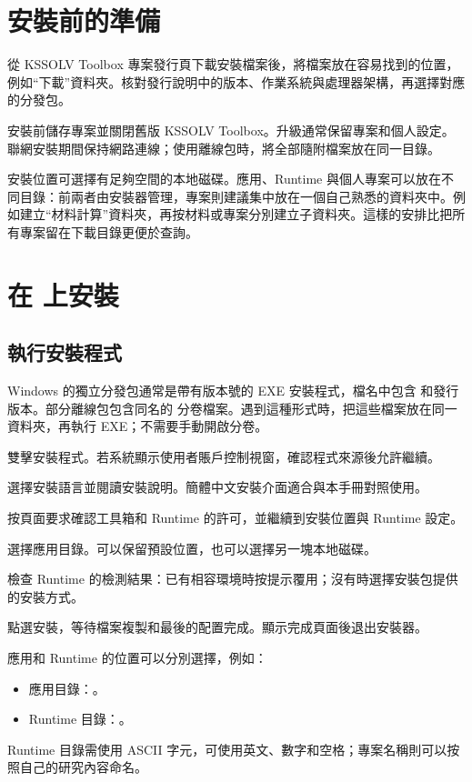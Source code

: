 \section{安裝前的準備}

從 KSSOLV Toolbox 專案發行頁下載安裝檔案後，將檔案放在容易找到的位置，例如“下載”資料夾。核對發行說明中的版本、作業系統與處理器架構，再選擇對應的分發包。

安裝前儲存專案並關閉舊版 KSSOLV Toolbox。升級通常保留專案和個人設定。聯網安裝期間保持網路連線；使用離線包時，將全部隨附檔案放在同一目錄。

安裝位置可選擇有足夠空間的本地磁碟。應用、Runtime 與個人專案可以放在不同目錄：前兩者由安裝器管理，專案則建議集中放在一個自己熟悉的資料夾中。例如建立“材料計算”資料夾，再按材料或專案分別建立子資料夾。這樣的安排比把所有專案留在下載目錄更便於查詢。


\section{在  上安裝}

\subsection{執行安裝程式}

Windows 的獨立分發包通常是帶有版本號的 EXE 安裝程式，檔名中包含  和發行版本。部分離線包包含同名的  分卷檔案。遇到這種形式時，把這些檔案放在同一資料夾，再執行 EXE；不需要手動開啟分卷。

\begin{steps}
\item 雙擊安裝程式。若系統顯示使用者賬戶控制視窗，確認程式來源後允許繼續。
\item 選擇安裝語言並閱讀安裝說明。簡體中文安裝介面適合與本手冊對照使用。
\item 按頁面要求確認工具箱和 Runtime 的許可，並繼續到安裝位置與 Runtime 設定。
\item 選擇應用目錄。可以保留預設位置，也可以選擇另一塊本地磁碟。
\item 檢查 Runtime 的檢測結果：已有相容環境時按提示覆用；沒有時選擇安裝包提供的安裝方式。
\item 點選安裝，等待檔案複製和最後的配置完成。顯示完成頁面後退出安裝器。
\end{steps}

應用和 Runtime 的位置可以分別選擇，例如：
\begin{itemize}[nosep]
\item 應用目錄：。
\item Runtime 目錄：。
\end{itemize}
Runtime 目錄需使用 ASCII 字元，可使用英文、數字和空格；專案名稱則可以按照自己的研究內容命名。


